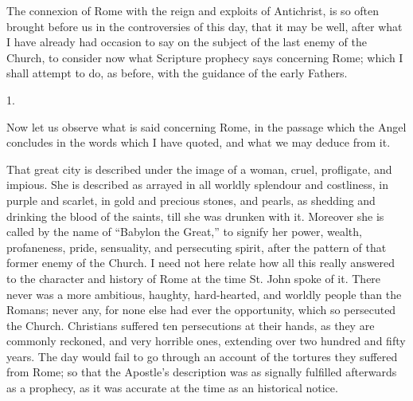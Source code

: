 The connexion of Rome with the reign and exploits of Antichrist, is
so often brought before us in the controversies of this day, that it
may be well, after what I have already had occasion to say on the
subject of the last enemy of the Church, to consider now what
Scripture prophecy says concerning Rome; which I shall attempt to do,
as before, with the guidance of the early Fathers.

1.

Now let us observe what is said concerning Rome, in the passage
which the Angel concludes in the words which I have quoted, and what
we may deduce from it.

That great city is described under the image of a woman, cruel,
profligate, and impious. She is described as arrayed in all worldly
splendour and costliness, in purple and scarlet, in gold and precious
stones, and pearls, as shedding and drinking the blood of the saints,
till she was drunken with it. Moreover she is called by the name of
``Babylon the Great,'' to signify her power, wealth,
profaneness, pride, sensuality, and persecuting spirit, after the
pattern of that former enemy of the Church. I need not here relate how
all this really answered to the character and history of Rome at the
time St. John spoke of it. There never was a more ambitious, haughty,
hard-hearted, and worldly people than the Romans; never any, for none
else had ever the opportunity, which so persecuted the Church.
Christians suffered ten persecutions at their hands, as they are
commonly reckoned, and very horrible ones, extending over two hundred
and fifty years. The day would fail to go through an account of the
tortures they suffered from Rome; so that the Apostle's description
was as signally fulfilled afterwards as a prophecy, as it was accurate
at the time as an historical notice.

